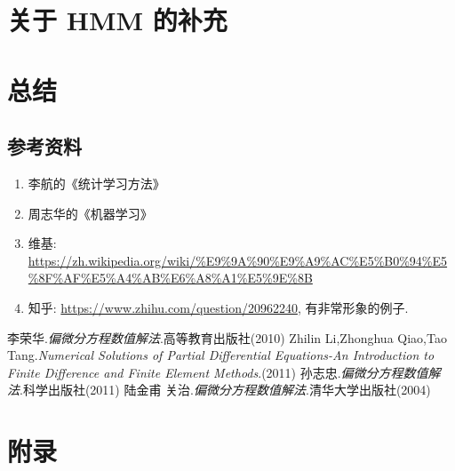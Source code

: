 \documentclass[a4paper,UTF8]{ctexart}
\theoremstyle{plain} \newtheorem{theorem}{定理}[section]
\theoremstyle{plain} \newtheorem{definition}{定义}[section]
\theoremstyle{plain} \newtheorem{lemma}{引理}[section]
\theoremstyle{plain} \newtheorem{proposition}{命题}[section]
\theoremstyle{plain} \newtheorem{example}{例}[section]
\theoremstyle{plain} \newtheorem{remark}{注}[section]
\theoremstyle{plain} \newtheorem{corollary}{推论}[section]
\begin{document}
\section{关于 HMM 的补充}












\section{总结}
\subsection{参考资料}
\begin{enumerate}[(1)]
\item 李航的《统计学习方法》

\item 周志华的《机器学习》

\item 维基: \url{https://zh.wikipedia.org/wiki/%E9%9A%90%E9%A9%AC%E5%B0%94%E5%8F%AF%E5%A4%AB%E6%A8%A1%E5%9E%8B}

\item 知乎: \url{https://www.zhihu.com/question/20962240}, 有非常形象的例子.



\end{enumerate}





\begin{thebibliography}{4}
   李荣华.\emph{偏微分方程数值解法}.高等教育出版社(2010) 
   Zhilin Li,Zhonghua Qiao,Tao Tang.\emph{Numerical Solutions of Partial Differential Equations-An Introduction to Finite Difference and Finite Element Methods}.(2011)
   孙志忠.\emph{偏微分方程数值解法}.科学出版社(2011)
   陆金甫 关治.\emph{偏微分方程数值解法}.清华大学出版社(2004)
  
\end{thebibliography}

\newpage

\section*{附录}
\end{document}
